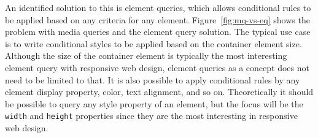 \documentclass[a4paper,11pt]{kth-mag}
\newcommand{\code}[1]{\texttt{#1}}
\begin{document}
    An identified solution to this is element queries, which allows conditional rules to be applied based on any criteria for any \gls{element}.
    Figure~\ref{fig:mq-vs-eq} shows the problem with \gls{media queries} and the element query solution.
    The typical use case is to write conditional styles to be applied based on the container \gls{element} size.
    Although the size of the container \gls{element} is typically the most interesting element query with \gls{responsive} \gls{web} design, element queries as a concept does not need to be limited to that.
    It is also possible to apply conditional rules by any \gls{element} display property, color, text alignment, and so on.
    Theoretically it should be possible to query any style property of an \gls{element}, but the focus will be the \code{width} and \code{height} properties since they are the most interesting in \gls{responsive} \gls{web} design.
\end{document}
